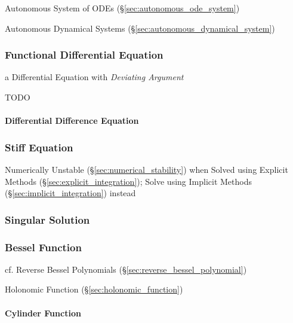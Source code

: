 \fist Autonomous System of ODEs (\S\ref{sec:autonomous_ode_system})

\fist Autonomous Dynamical Systems (\S\ref{sec:autonomous_dynamical_system})



\subsubsection{Functional Differential Equation}\label{sec:fde}

a Differential Equation with \emph{Deviating Argument}

TODO



\paragraph{Differential Difference Equation}\label{sec:dde}\hfill



\subsubsection{Stiff Equation}\label{sec:stiff_equation}

Numerically Unstable (\S\ref{sec:numerical_stability}) when Solved using
Explicit Methods (\S\ref{sec:explicit_integration});
Solve using Implicit Methods (\S\ref{sec:implicit_integration}) instead



\subsubsection{Singular Solution}\label{sec:singular_solution}

\subsubsection{Bessel Function}\label{sec:bessel_function}

cf. Reverse Bessel Polynomials (\S\ref{sec:reverse_bessel_polynomial})

\fist Holonomic Function (\S\ref{sec:holonomic_function})



\paragraph{Cylinder Function}\label{sec:cylinder_function}\hfill


